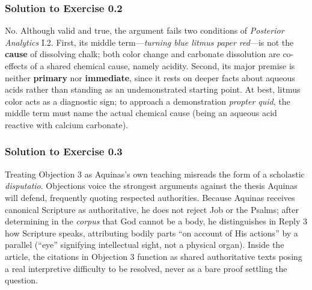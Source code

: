 \subsubsection*{Solution to Exercise 0.2}
No. Although valid and true, the argument fails two conditions of \emph{Posterior Analytics} I.2. First, its middle term---\emph{turning blue litmus paper red}---is not the \textbf{cause} of dissolving chalk; both color change and carbonate dissolution are co-effects of a shared chemical cause, namely acidity. Second, its major premise is neither \textbf{primary} nor \textbf{immediate}, since it rests on deeper facts about aqueous acids rather than standing as an undemonstrated starting point. At best, litmus color acts as a diagnostic sign; to approach a demonstration \emph{propter quid}, the middle term must name the actual chemical cause (being an aqueous acid reactive with calcium carbonate).

\subsubsection*{Solution to Exercise 0.3}
Treating Objection 3 as Aquinas's own teaching misreads the form of a scholastic \emph{disputatio}. Objections voice the strongest arguments against the thesis Aquinas will defend, frequently quoting respected authorities. Because Aquinas receives canonical Scripture as authoritative, he does not reject Job or the Psalms; after determining in the \emph{corpus} that God cannot be a body, he distinguishes in Reply 3 how Scripture speaks, attributing bodily parts ``on account of His actions'' by a parallel (``eye'' signifying intellectual sight, not a physical organ). Inside the article, the citations in Objection 3 function as shared authoritative texts posing a real interpretive difficulty to be resolved, never as a bare proof settling the question.
